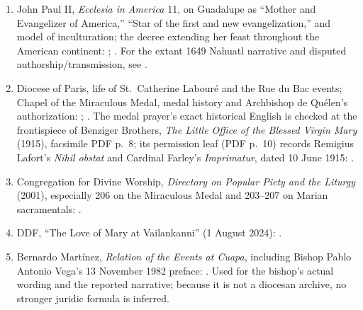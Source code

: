 \begin{enumerate}
  \item John Paul II, \emph{Ecclesia in America} 11, on Guadalupe as ``Mother and Evangelizer of America,'' ``Star of the first and new evangelization,'' and model of inculturation; the decree extending her feast throughout the American continent: ; . For the extant 1649 Nahuatl narrative and disputed authorship/transmission, see .
  \item Diocese of Paris, life of St.~Catherine Labouré and the Rue du Bac events; Chapel of the Miraculous Medal, medal history and Archbishop de Quélen's authorization: ; . The medal prayer's exact historical English is checked at the frontispiece of Benziger Brothers, \emph{The Little Office of the Blessed Virgin Mary} (1915), facsimile PDF p.~8; its permission leaf (PDF p.~10) records Remigius Lafort's \emph{Nihil obstat} and Cardinal Farley's \emph{Imprimatur}, dated 10 June 1915: .
  \item Congregation for Divine Worship, \emph{Directory on Popular Piety and the Liturgy} (2001), especially 206 on the Miraculous Medal and 203--207 on Marian sacramentals: .
  \item DDF, ``The Love of Mary at Vailankanni'' (1 August 2024): .
  \item Bernardo Martínez, \emph{Relation of the Events at Cuapa}, including Bishop Pablo Antonio Vega's 13 November 1982 preface: . Used for the bishop's actual wording and the reported narrative; because it is not a diocesan archive, no stronger juridic formula is inferred.
\end{enumerate}

